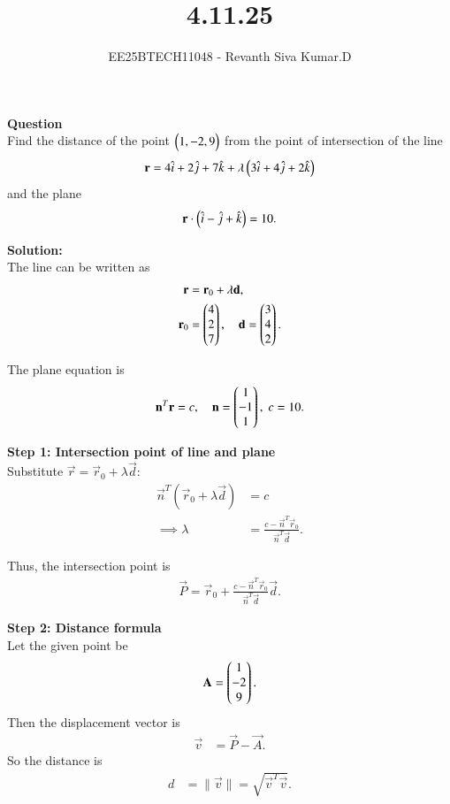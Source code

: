 \documentclass[journal]{IEEEtran}
\begin{document}

\vspace{3cm}

\title{4.11.25}
\author{EE25BTECH11048 - Revanth Siva Kumar.D}
{\let\newpage\relax\maketitle}

\textbf{Question} \\
Find the distance of the point $\begin{pmatrix}1,-2,9\end{pmatrix}$ from the point of intersection of the line
\[
\mathbf{r} = 4\hat{i} + 2\hat{j} + 7\hat{k} + \lambda \begin{pmatrix}3\hat{i} + 4\hat{j} + 2\hat{k}\end{pmatrix}
\]
and the plane
\[
\mathbf{r}\cdot\begin{pmatrix}\hat{i} - \hat{j} + \hat{k}\end{pmatrix} = 10.
\]

\textbf{Solution:} \\

The line can be written as
\begin{align}
    \mathbf{r} &= \mathbf{r}_0 + \lambda \mathbf{d}, \\
    \mathbf{r}_0 &= \begin{pmatrix}4 \\ 2 \\ 7\end{pmatrix}, \quad
    \mathbf{d} = \begin{pmatrix}3 \\ 4 \\ 2\end{pmatrix}.
\end{align}

The plane equation is
\begin{align}
    \mathbf{n}^T \mathbf{r} = c, \quad
    \mathbf{n} = \begin{pmatrix}1 \\ -1 \\ 1\end{pmatrix}, \; c = 10.
\end{align}

\textbf{Step 1: Intersection point of line and plane} \\
Substitute $\vec{r} = \vec{r}_0 + \lambda \vec{d}$:
\begin{align}
    \vec{n}^T(\vec{r}_0 + \lambda \vec{d}) &= c \\
    \implies \lambda &= \frac{c - \vec{n}^T\vec{r}_0}{\vec{n}^T\vec{d}}.
\end{align}

Thus, the intersection point is
\begin{align}
    \vec{P} = \vec{r}_0 + 
    \frac{c - \vec{n}^T\vec{r}_0}{\vec{n}^T\vec{d}} \vec{d}.
\end{align}

\textbf{Step 2: Distance formula} \\
Let the given point be 
\begin{align}
    \mathbf{A} = \begin{pmatrix}1 \\ -2 \\ 9\end{pmatrix}.
\end{align}
Then the displacement vector is
\begin{align}
    \vec{v} &= \vec{P} - \vec{A}.
\end{align}
So the distance is
\begin{align}
    d &= \|\vec{v}\| = \sqrt{\vec{v}^T \vec{v}}.
\end{align}
\end{document}
